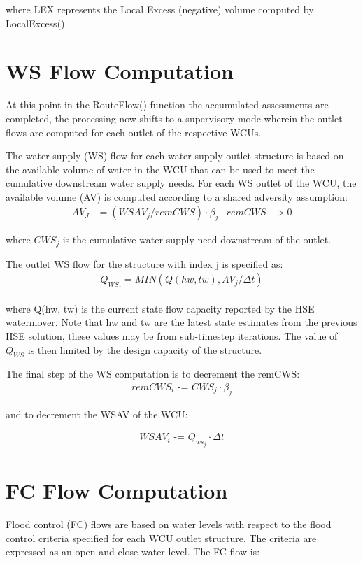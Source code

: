 where LEX represents the Local Excess (negative) volume computed by LocalExcess(). 

\section{WS Flow Computation}
At this point in the RouteFlow() function the accumulated assessments
are completed, the processing now shifts to a supervisory mode wherein
the outlet flows are computed for each outlet of the respective WCUs.

The water supply (WS) flow for each water supply outlet structure is
based on the available volume of water in the WCU that can be used to
meet the cumulative downstream water supply needs. For each WS outlet
of the WCU, the available volume (AV) is computed according to a
shared adversity assumption:
\begin{align}
  AV_J &= (WSAV_j / remCWS) \cdot \beta_j &remCWS &> 0
\end{align}

where $CWS_j$ is the cumulative water supply need downstream of the
outlet.

The outlet WS flow for the structure with index j is specified as: 
\begin{align}
 Q_{WS_j} = MIN ( Q(hw, tw), AV_j / \Delta t)
\end{align}

where Q(hw, tw) is the current state flow capacity reported by the HSE
watermover. Note that hw and tw are the latest state estimates from
the previous HSE solution, these values may be from sub-timestep
iterations. The value of $Q_{WS}$ is then limited by the design
capacity of the structure.

The final step of the WS computation is to decrement the remCWS: 
\begin{align}
  remCWS_i \text{ -= } CWS_j \cdot \beta_j
\end{align}

and to decrement the WSAV of the WCU: 

\begin{align}
  WSAV_i \text{ -= } Q_{ws_j} \cdot \Delta t
\end{align}

\section{FC Flow Computation}

Flood control (FC) flows are based on water levels with respect to the
flood control criteria specified for each WCU outlet structure. The
criteria are expressed as an open and close water level. The FC flow
is:


